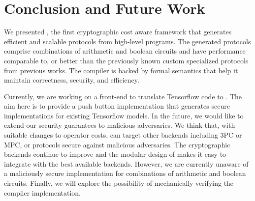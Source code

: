 \section{Conclusion and Future Work}
\label{sec:conclude}

We presented \tool, the first
cryptographic cost aware framework that generates efficient and
scalable \mpc protocols from high-level programs.
The generated protocols comprise combinations
of arithmetic and boolean circuits and have performance comparable to, or better than the previously known custom specialized
protocols from previous works.
The compiler is backed by formal semantics that help 
it maintain correctness, security,
and efficiency.

Currently, we are working on a front-end to translate Tensorflow code
to \tool. The aim here is to provide a push button implementation
that generates secure implementations for existing Tensorflow models. 
In the future, we would like to extend our security guarantees to
malicious adversaries. We think that, with suitable
changes to operator costs, \tool can target other backends including 3PC or
MPC, or protocols secure against malicious adversaries.
 The cryptographic backends continue to improve and the modular design of \tool makes it easy to integrate with the best available backends.
However, we are currently unaware of a maliciously secure \mpc implementation for combinations of
arithmetic and boolean circuits.
Finally, we will explore the possibility of mechanically verifying the  compiler implementation.






